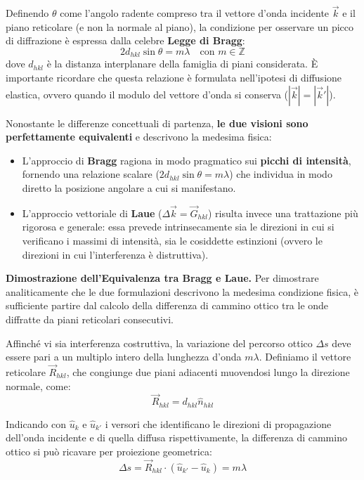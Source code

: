 Definendo \( \theta \) come l'angolo radente compreso tra il vettore d'onda incidente \( \vec{k} \) e il piano reticolare (e non la normale al piano), la condizione per osservare un picco di diffrazione è espressa dalla celebre \textbf{Legge di Bragg}:
\begin{equation}
    2d_{hkl} \sin\theta = m\lambda \quad \text{con } m \in \mathbb{Z}
\end{equation}
dove \( d_{hkl} \) è la distanza interplanare della famiglia di piani considerata. È importante ricordare che questa relazione è formulata nell'ipotesi di diffusione elastica, ovvero quando il modulo del vettore d'onda si conserva (\( |\vec{k}| = |\vec{k}'| \)).

Nonostante le differenze concettuali di partenza, \textbf{le due visioni sono perfettamente equivalenti} e descrivono la medesima fisica:
\begin{itemize}
    \item L'approccio di \textbf{Bragg} ragiona in modo pragmatico sui \textbf{picchi di intensità}, fornendo una relazione scalare (\( 2d_{hkl}\sin\theta = m\lambda \)) che individua in modo diretto la posizione angolare a cui si manifestano.
    \item L'approccio vettoriale di \textbf{Laue} (\( \Delta\vec{k} = \vec{G}_{hkl} \)) risulta invece una trattazione più rigorosa e generale: essa prevede intrinsecamente sia le direzioni in cui si verificano i massimi di intensità, sia le cosiddette estinzioni (ovvero le direzioni in cui l'interferenza è distruttiva).
\end{itemize}


\textbf{Dimostrazione dell'Equivalenza tra Bragg e Laue.} Per dimostrare analiticamente che le due formulazioni descrivono la medesima condizione fisica, è sufficiente partire dal calcolo della differenza di cammino ottico tra le onde diffratte da piani reticolari consecutivi. 

Affinché vi sia interferenza costruttiva, la variazione del percorso ottico \( \Delta s \) deve essere pari a un multiplo intero della lunghezza d'onda \( m\lambda \). Definiamo il vettore reticolare \( \vec{R}_{hkl} \), che congiunge due piani adiacenti muovendosi lungo la direzione normale, come:
\begin{equation}
    \vec{R}_{hkl} = d_{hkl}\hat{n}_{hkl}
\end{equation}

Indicando con \( \hat{u}_{k} \) e \( \hat{u}_{k'} \) i versori che identificano le direzioni di propagazione dell'onda incidente e di quella diffusa rispettivamente, la differenza di cammino ottico si può ricavare per proiezione geometrica:
\begin{equation}
    \Delta s = \vec{R}_{hkl} \cdot (\hat{u}_{k'} - \hat{u}_{k}) = m\lambda
\end{equation}

